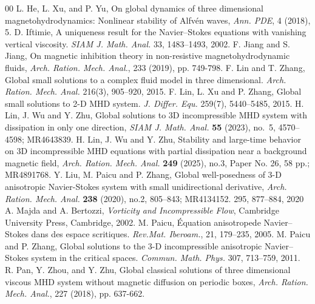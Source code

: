 \documentclass[11pt]{amsart}
\theoremstyle{definition}
\numberwithin{equation}{section}
\begin{document}
\begin{thebibliography}{00}
	L. He, L. Xu, and P. Yu, On global dynamics of three dimensional magnetohydrodynamics: Nonlinear stability of Alfv\'en waves, {\it Ann. PDE}, 4 (2018), 5.
	D. Iftimie, A uniqueness result for the Navier–Stokes equations with vanishing vertical viscosity. {\it SIAM J. Math. Anal.} 33, 1483–1493, 2002.
	F. Jiang and S. Jiang, On magnetic inhibition theory in non-resistive magnetohydrodynamic fluids, {\it Arch. Ration. Mech. Anal.}, 233 (2019), pp. 749-798.
	 F. Lin and  T. Zhang, Global small solutions to a complex fluid model in three dimensional.
	{\it Arch. Ration. Mech. Anal.} 216(3), 905–920, 2015.
	 F. Lin,  L.  Xu and  P.  Zhang, Global small solutions to 2-D MHD system. {\it J. Differ. Equ.} 259(7), 5440–5485, 2015.
	H. Lin, J. Wu and Y. Zhu, Global solutions to 3D incompressible MHD system with dissipation in only one direction, {\it SIAM J. Math. Anal.} {\bf 55} (2023), no.~5, 4570--4598; MR4643839.
	H. Lin, J. Wu and Y. Zhu, Stability and large-time behavior on 3D incompressible MHD equations with partial dissipation near a background magnetic field, {\it Arch. Ration. Mech. Anal.} {\bf 249} (2025), no.3, Paper No. 26, 58 pp.; MR4891768.
	Y. Liu, M. Paicu and P. Zhang, Global well-posedness of 3-D anisotropic Navier-Stokes system with small unidirectional derivative, {\it Arch. Ration. Mech. Anal.} {\bf 238} (2020), no.2, 805--843; MR4134152. 295, 877–884, 2020
	A. Majda and A. Bertozzi, {\it Vorticity and Incompressible Flow}, Cambridge University Press, Cambridge, 2002.
	M. Paicu, Équation anisotropede Navier–Stokes dans des espace scritiques. {\it Rev.Mat. Iberoam.}, 21, 179–235, 2005.
	 M. Paicu and  P. Zhang, Global solutions to the 3-D incompressible anisotropic Navier– Stokes system in the critical spaces. {\it Commun. Math. Phys.} 307, 713–759, 2011.
	 R. Pan, Y. Zhou, and Y. Zhu, Global classical solutions of three dimensional viscous MHD system without magnetic diffusion on periodic boxes, {\it Arch. Ration. Mech. Anal.}, 227 (2018), pp. 637-662.

\end{thebibliography}
\end{document}
